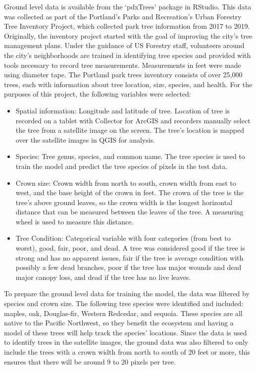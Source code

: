 \documentclass[12pt,twoside]{reedthesis}
\begin{document}
Ground level data is available from the `pdxTrees' package in RStudio. This data was collected as part of the Portland's Parks and Recreation's Urban Forestry Tree Inventory Project, which collected park tree information from 2017 to 2019. Originally, the inventory project started with the goal of improving the city's tree management plans. Under the guidance of US Forestry staff, volunteers around the city's neighborhoods are trained in identifying tree species and provided with tools necessary to record tree measurements. Measurements in feet were made using diameter tape. The Portland park trees inventory consists of over 25,000 trees, each with information about tree location, size, species, and health. For the purposes of this project, the following variables were selected:
\begin{itemize}
\item
  Spatial information: Longitude and latitude of tree. Location of tree is recorded on a tablet with Collector for ArcGIS and recorders manually select the tree from a satellite image on the screen. The tree's location is mapped over the satellite images in QGIS for analysis.
\item
  Species: Tree genus, species, and common name. The tree species is used to train the model and predict the tree species of pixels in the test data.
\item
  Crown size: Crown width from north to south, crown width from east to west, and the base height of the crown in feet. The crown of the tree is the tree's above ground leaves, so the crown width is the longest horizontal distance that can be measured between the leaves of the tree. A measuring wheel is used to measure this distance.
\item
  Tree Condition: Categorical variable with four categories (from best to worst), good, fair, poor, and dead. A tree was considered good if the tree is strong and has no apparent issues, fair if the tree is average condition with possibly a few dead branches, poor if the tree has major wounds and dead major canopy loss, and dead if the tree has no live leaves.
\end{itemize}
To prepare the ground level data for training the model, the data was filtered by species and crown size. The following tree species were identified and included: maples, oak, Douglas-fir, Western Redcedar, and sequoia. These species are all native to the Pacific Northwest, so they benefit the ecosystem and having a model of these trees will help track the species' locations. Since the data is used to identify trees in the satellite images, the ground data was also filtered to only include the trees with a crown width from north to south of 20 feet or more, this ensures that there will be around 9 to 20 pixels per tree.
\end{document}
